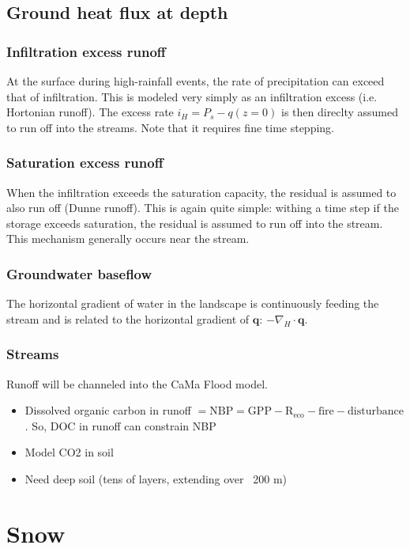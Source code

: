 \documentclass{article}
\begin{document}
\subsection{Ground heat flux at depth}
\subsubsection{Infiltration excess runoff}
At the surface during high-rainfall events, the rate of precipitation can exceed that of infiltration. This is modeled very simply as an infiltration excess (i.e. Hortonian runoff). The excess rate $i_H = P_s-q(z=0)$ is then direclty assumed to run off into the streams. Note that it requires fine time stepping.

\subsubsection{Saturation excess runoff}
When the infiltration exceeds the saturation capacity, the residual is assumed to also run off (Dunne runoff). This is again quite simple: withing a time step if the storage exceeds saturation, the residual is assumed to run off into the stream. This mechanism generally occurs near the stream.

\subsubsection{Groundwater baseflow}
The horizontal gradient of water in the landscape is continuously feeding the stream and is related to the horizontal gradient of $\mathbf{q}$: $-\nabla_H \cdot \mathbf{q}$.

\subsubsection{Streams}
Runoff will be channeled into the CaMa Flood model.

\begin{itemize}
\item Dissolved organic carbon in runoff $\mathrm{= NBP = GPP - R_{eco} - fire - disturbance}$. So, DOC in runoff can constrain NBP
\item Model CO2 in soil
\item Need deep soil (tens of layers, extending over ~200 m)
\end{itemize}

\section{Snow}
\end{document}
